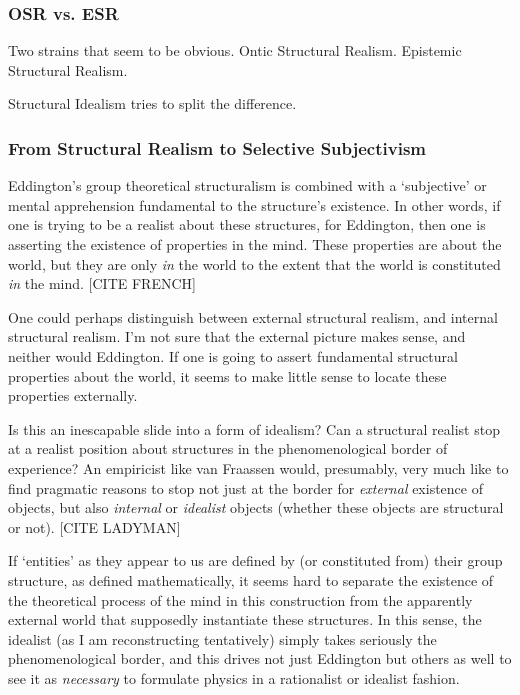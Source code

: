 \subsubsection{OSR vs. ESR}

Two strains that seem to be obvious.  Ontic Structural Realism.  Epistemic Structural Realism.

Structural Idealism tries to split the difference.




\subsubsection{From Structural Realism to Selective Subjectivism}

Eddington's group theoretical structuralism is combined with a `subjective' or mental apprehension fundamental to the structure's existence.  In other words, if one is trying to be a realist about these structures, for Eddington, then one is asserting the existence of properties in the mind.  These properties are about the world, but they are only \emph{in} the world to the extent that the world is constituted \emph{in} the mind.  [CITE FRENCH]  

One could perhaps distinguish between external structural realism, and internal structural realism.  I'm not sure that the external picture makes sense, and neither would Eddington.  If one is going to assert fundamental structural properties about the world, it seems to make little sense to locate these properties externally.  

Is this an inescapable slide into a form of idealism?  Can a structural realist stop at a realist position about structures in the phenomenological border of experience?  An empiricist like van Fraassen would, presumably, very much like to find pragmatic reasons to stop not just at the border for \emph{external} existence of objects, but also \emph{internal} or \emph{idealist} objects (whether these objects are structural or not).  [CITE LADYMAN]

If `entities' as they appear to us are defined by (or constituted from) their group structure, as defined mathematically, it seems hard to separate the existence of the theoretical process of the mind in this construction from the apparently external world that supposedly instantiate these structures.  In this sense, the idealist (as I am reconstructing tentatively) simply takes seriously the phenomenological border, and this drives not just Eddington but others as well to see it as \emph{necessary} to formulate physics in a rationalist or idealist fashion.  

